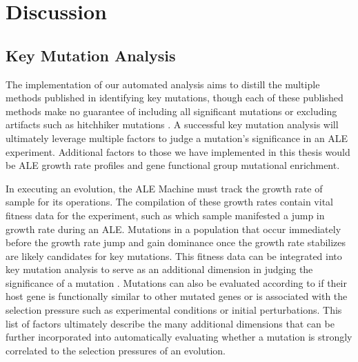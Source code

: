 \documentclass[12pt,final,masters,chapterheads]{ucsd}  %
\begin{document}
\chapter{Discussion}
%
%
%
%
%
%
%
%
\section{Key Mutation Analysis}
%
%
%
%
The implementation of our automated analysis aims to distill the multiple methods published in identifying key mutations, though each of these published methods make no guarantee of including all significant mutations or excluding artifacts such as hitchhiker mutations \cite{pmid25304508}. A successful key mutation analysis will ultimately leverage multiple factors to judge a mutation's significance in an ALE experiment. Additional factors to those we have implemented in this thesis would be ALE growth rate profiles and gene functional group mutational enrichment.

In executing an evolution, the ALE Machine must track the growth rate of sample for its operations. The compilation of these growth rates contain vital fitness data for the experiment, such as which sample manifested a jump in growth rate during an ALE. Mutations in a population that occur immediately before the growth rate jump and gain dominance once the growth rate stabilizes are likely candidates for key mutations. This fitness data can be integrated into key mutation analysis to serve as an additional dimension in judging the significance of a mutation \cite{pmid25304508}. Mutations can also be evaluated according to if their host gene is functionally similar to other mutated genes or is associated with the selection pressure such as experimental conditions or initial perturbations. This list of factors ultimately describe the many additional dimensions that can be further incorporated into automatically evaluating whether a mutation is strongly correlated to the selection pressures of an evolution.
\end{document}
